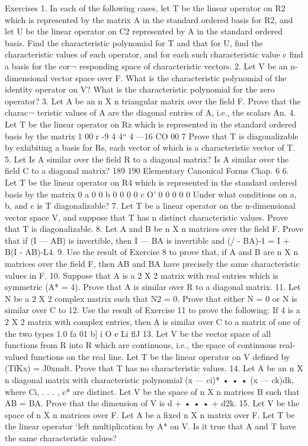 Exercises 1. In each of the following cases, let T be the linear operator on R2 which is represented by the matrix A in the standard ordered basis for R2, and let U be the linear operator on C2 represented by A in the standard ordered basis. Find the characteristic polynomial for T and that for U, find the characteristic values of each operator, and for each such characteristic value c find a basis for the cor¬ responding space of characteristic vectors. 2. Let V be an n-dimensional vector space over F. What is the characteristic polynomial of the identity operator on V? What is the characteristic polynomial for the zero operator? 3. Let A be an n X n triangular matrix over the field F. Prove that the charac¬ teristic values of A are the diagonal entries of A, i.e., the scalars An. 4. Let T be the linear operator on Rz which is represented in the standard ordered basis by the matrix 1 00 r -9 4 4“ 4  —16 CO 00 7 Prove that T is diagonalizable by exhibiting a basis for Rs, each vector of which is a characteristic vector of T. 5. Let Is A similar over the field R to a diagonal matrix? Is A similar over the field C to a diagonal matrix? 189 190 Elementary Canonical Forms Chap. 6 6. Let T be the linear operator on R4 which is represented in the standard ordered basis by the matrix 0 a 0 0 b 0 0 0 0 c O' 0 0 0 0 0 Under what conditions on a, b, and c is T diagonalizable? 7. Let T be a linear operator on the n-dimensional vector space V, and suppose that T has n distinct characteristic values. Prove that T is diagonalizable. 8. Let A and B be n X n matrices over the field F. Prove that if (I — AB) is invertible, then I — BA is invertible and (/ - BA)-1 = I + B(I - AB)-L4. 9. Use the result of Exercise 8 to prove that, if A and B are n X n matrices over the field F, then AB and BA have precisely the same characteristic values in F. 10. Suppose that A is a 2 X 2 matrix with real entries which is symmetric (A* = 4). Prove that A is similar over R to a diagonal matrix. 11. Let N be a 2 X 2 complex matrix such that N2 = 0. Prove that either N = 0 or N is similar over C to 12. Use the result of Exercise 11 to prove the following: If 4 is a 2 X 2 matrix with complex entries, then A is similar over C to a matrix of one of the two types 1.0 fa 01 b] i O e Li flJ 13. Let V be the vector space of all functions from R into R which are continuous, i.e., the space of continuous real-valued functions on the real line. Let T be the linear operator on V defined by (TfKx) = J0xmdt. Prove that T has no characteristic values. 14. Let A be an n X n diagonal matrix with characteristic polynomial (x — ci)* • • • (x — ck)dk, where Ci, . . . , c* are distinct. Let V be the space of n X n matrices B such that AB = BA. Prove that the dimension of V is d + • • • + d2k. 15. Let V be the space of n X n matrices over F. Let A be a fixed n X n matrix over F. Let T be the linear operator ‘left multiplication by A* on V. Is it true that A and T have the same characteristic values?
